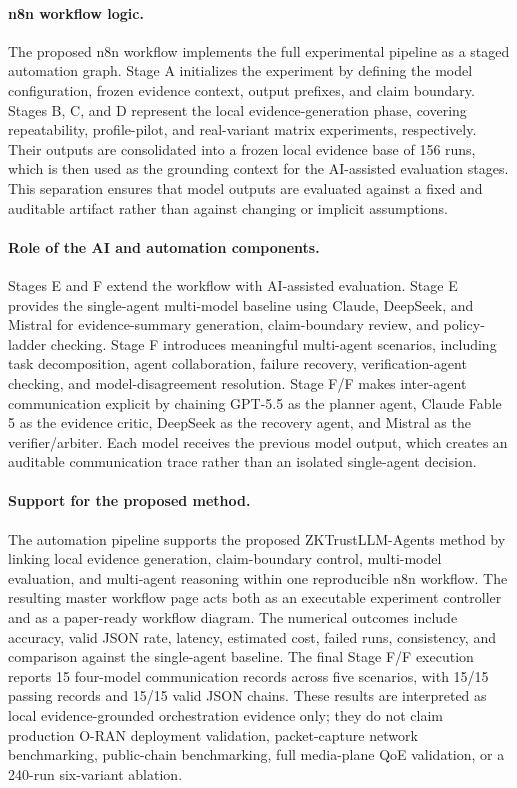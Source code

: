 \paragraph{n8n workflow logic.}
The proposed n8n workflow implements the full experimental pipeline as a staged automation graph. Stage A initializes the experiment by defining the model configuration, frozen evidence context, output prefixes, and claim boundary. Stages B, C, and D represent the local evidence-generation phase, covering repeatability, profile-pilot, and real-variant matrix experiments, respectively. Their outputs are consolidated into a frozen local evidence base of 156 runs, which is then used as the grounding context for the AI-assisted evaluation stages. This separation ensures that model outputs are evaluated against a fixed and auditable artifact rather than against changing or implicit assumptions.

\paragraph{Role of the AI and automation components.}
Stages E and F extend the workflow with AI-assisted evaluation. Stage E provides the single-agent multi-model baseline using Claude, DeepSeek, and Mistral for evidence-summary generation, claim-boundary review, and policy-ladder checking. Stage F introduces meaningful multi-agent scenarios, including task decomposition, agent collaboration, failure recovery, verification-agent checking, and model-disagreement resolution. Stage F/F makes inter-agent communication explicit by chaining GPT-5.5 as the planner agent, Claude Fable 5 as the evidence critic, DeepSeek as the recovery agent, and Mistral as the verifier/arbiter. Each model receives the previous model output, which creates an auditable communication trace rather than an isolated single-agent decision.

\paragraph{Support for the proposed method.}
The automation pipeline supports the proposed ZKTrustLLM-Agents method by linking local evidence generation, claim-boundary control, multi-model evaluation, and multi-agent reasoning within one reproducible n8n workflow. The resulting master workflow page acts both as an executable experiment controller and as a paper-ready workflow diagram. The numerical outcomes include accuracy, valid JSON rate, latency, estimated cost, failed runs, consistency, and comparison against the single-agent baseline. The final Stage F/F execution reports 15 four-model communication records across five scenarios, with 15/15 passing records and 15/15 valid JSON chains. These results are interpreted as local evidence-grounded orchestration evidence only; they do not claim production O-RAN deployment validation, packet-capture network benchmarking, public-chain benchmarking, full media-plane QoE validation, or a 240-run six-variant ablation.


